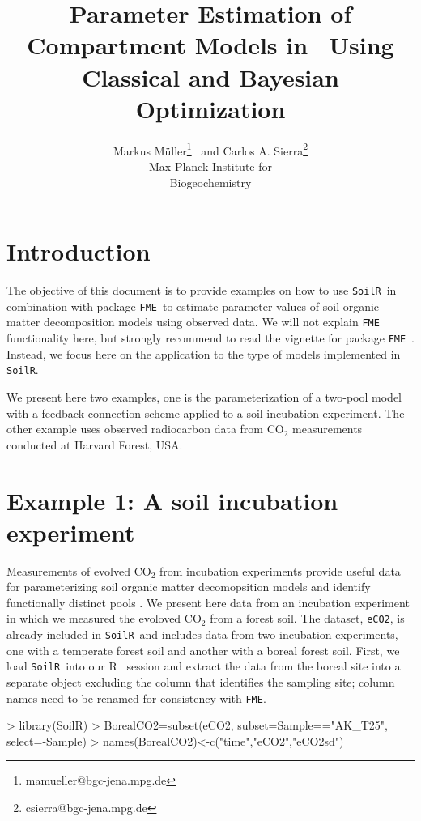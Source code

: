 \documentclass[a4paper]{article}
\title{Parameter Estimation of Compartment Models in \SoilR \, Using Classical and Bayesian Optimization}
\author{Markus M\"uller\thanks{mamueller@bgc-jena.mpg.de} \ 
     and Carlos A. Sierra\thanks{csierra@bgc-jena.mpg.de} \\ 
         Max Planck Institute for \\
         Biogeochemistry }
\newcommand{\R}{\textsf{R }}
\newcommand{\SoilR}{\texttt{SoilR}}
\newcommand{\FME}{\texttt{FME}}
\begin{document}

\maketitle



\section*{Introduction}
The objective of this document is to provide examples on how to use \SoilR \, in combination with package \FME \,
to estimate parameter values of soil organic matter decomposition models using observed 
data. We will not explain \FME \, functionality here, but strongly recommend to read the vignette for package \FME \, \citep{Soetaert}.
Instead, we focus here on the application to the type of models implemented in \SoilR. 

We present here two examples, one is the parameterization of a two-pool model with a feedback connection scheme applied to a soil incubation experiment. The other example uses observed radiocarbon data from CO$_2$ measurements conducted at Harvard Forest, USA. 

\section*{Example 1: A soil incubation experiment}
Measurements of evolved CO$_2$ from incubation experiments provide useful data for parameterizing soil organic matter decomopsition models and identify functionally distinct pools \citep{Schadel}. We present here data from an incubation experiment in which we measured the evoloved CO$_2$ from a forest soil. The dataset, {\tt eCO2}, is already included in \SoilR \, and includes data from two incubation experiments, one with a temperate forest soil and another with a boreal forest soil. First, we load \SoilR \, into our \R \, session and extract the data from the boreal site into a separate object excluding the column that identifies the sampling site; column names need to be renamed for consistency with \FME.

\begin{Schunk}
\begin{Sinput}
> library(SoilR)
> BorealCO2=subset(eCO2, subset=Sample=="AK_T25", select=-Sample)
> names(BorealCO2)<-c("time","eCO2","eCO2sd")
\end{Sinput}
\end{Schunk}
\end{document}
